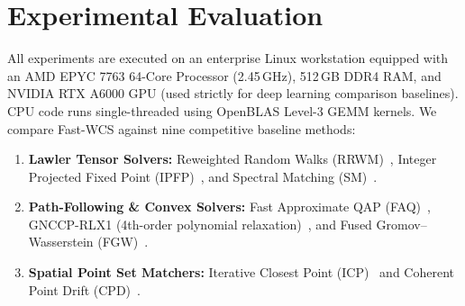 \documentclass[a4paper,fleqn]{cas-dc}
\theoremstyle{thmstyleone}
\theoremstyle{thmstyletwo}
\theoremstyle{thmstylethree}
\begin{document}
\section{Experimental Evaluation}
\label{sec:experiments}

All experiments are executed on an enterprise Linux workstation equipped with an AMD EPYC 7763 64-Core Processor (2.45\,GHz), 512\,GB DDR4 RAM, and NVIDIA RTX A6000 GPU (used strictly for deep learning comparison baselines). CPU code runs single-threaded using OpenBLAS Level-3 GEMM kernels. We compare Fast-WCS against nine competitive baseline methods:
\begin{enumerate}
    \item \textbf{Lawler Tensor Solvers:} Reweighted Random Walks (RRWM)~\cite{cho2010rrwm}, Integer Projected Fixed Point (IPFP)~\cite{leordeanu2009ipfp}, and Spectral Matching (SM)~\cite{leordeanu2005}.
    \item \textbf{Path-Following \& Convex Solvers:} Fast Approximate QAP (FAQ)~\cite{vogelstein2015fast}, GNCCP-RLX1 (4th-order polynomial relaxation)~\cite{yang2018algorithm}, and Fused Gromov--Wasserstein (FGW)~\cite{titouan2019optimal}.
    \item \textbf{Spatial Point Set Matchers:} Iterative Closest Point (ICP)~\cite{besl1992icp} and Coherent Point Drift (CPD)~\cite{myronenko2010cpd}.
\end{enumerate}
\end{document}
